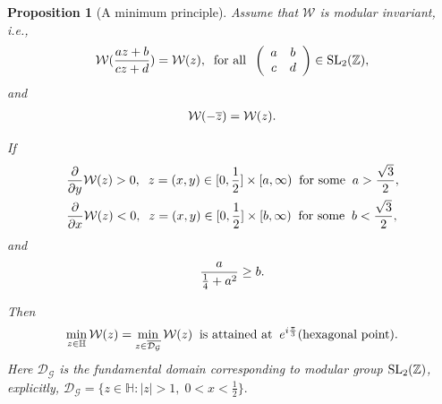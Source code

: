 \documentclass[10pt,a4paper]{amsart}
\newtheorem{proposition}{Proposition}
\begin{document}
\begin{proposition}[A minimum principle]\label{Prop31}  Assume that $\mathcal{W}$ is modular invariant, i.e.,
 \begin{equation}\aligned\label{M999}
\mathcal{W}(\frac{az+b}{cz+d})=\mathcal{W}(z),\;\;\hbox{for all}\;\;\left(
                                                                      \begin{array}{cc}
                                                                        a & b \\
                                                                        c & d \\
                                                                      \end{array}
                                                                    \right)\in \hbox{SL}_2(\mathbb{Z}),
\endaligned\end{equation}
and
 \begin{equation}\aligned\nonumber
\mathcal{W}(-\overline{z})=\mathcal{W}(z).
\endaligned\end{equation}

If \begin{equation}\aligned\label{Cabc1}
&\frac{\partial}{\partial y}\mathcal{W}(z)>0,\;\;z=(x,y)\in[0,\frac{1}{2}]\times[a,\infty)\;\;\hbox{for some}\;\;a>\frac{\sqrt3}{2},\\
&\frac{\partial}{\partial x}\mathcal{W}(z)<0,\;\;z=(x,y)\in[0,\frac{1}{2}]\times[b,\infty)\;\;\hbox{for some}\;\;b<\frac{\sqrt3}{2},
\endaligned\end{equation}
and
 \begin{equation}\aligned\label{fff}
\frac{a}{\frac{1}{4}+a^2}\geq b.
\endaligned\end{equation}

Then
\begin{equation}\aligned\nonumber
\min_{z\in\mathbb{H}}\mathcal{W}(z)=\min_{z\in\overline{\mathcal{D}_{\mathcal{G}}}}\mathcal{W}(z)\;\;\hbox{is attained at}\;\; e^{i\frac{\pi}{3}}(\hbox{hexagonal point}).
\endaligned\end{equation}
Here $\mathcal{D}_{\mathcal{G}}$ is the fundamental domain corresponding to modular group $\hbox{SL}_2(\mathbb{Z})$, explicitly, $\mathcal{D}_{\mathcal{G}}=\{
z\in\mathbb{H}: |z|>1,\; 0<x<\frac{1}{2}
\}.$
\end{proposition}
\end{document}
